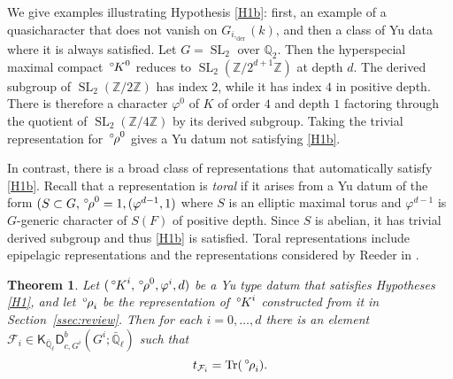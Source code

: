 \documentclass[10pt]{amsart}
\theoremstyle{plain}
\newtheorem{theorem}{Theorem}[section]
\theoremstyle{definition}
\newcommand{\ZZ}{{\mathbb{Z}}}
\newcommand{\QQ}{{\mathbb{Q}}}
\newcommand{\EE}{\mathbb{\bar Q}_\ell}
\DeclareMathOperator{\trace}{Tr}
\DeclareMathOperator{\SL}{SL}
\newcommand{\der}{_{\operatorname{der}}}
\newcommand{\trFrob}[1]{t_{#1}}
\newcommand{\cs}[1]{{\mathcal{#1}}}
\newcommand{\oK}{{\,^\circ \hskip-1pt K}}
\newcommand{\orho}{{\,^\circ \hskip-1pt \rho}}
\begin{document}
We give examples illustrating Hypothesis \ref{H1b}: first,
an example of a quasicharacter that does not vanish on $G_{i, \der}(k)$,
and then a class of Yu data where it is always satisfied.
Let $G = \SL_2$ over $\QQ_2$.
Then the hyperspecial maximal compact $\oK^0$ reduces to $\SL_2(\ZZ/2^{d+1}\ZZ)$ at depth $d$.
The derived subgroup of $\SL_2(\ZZ/2\ZZ)$ has index $2$, while it has index $4$ in positive depth.
There is therefore a character $\varphi^0$ of $K$ of order $4$ and depth $1$
factoring through the quotient of $\SL_2(\ZZ/4\ZZ)$ by its derived subgroup.
Taking the trivial representation for $\orho^0$ gives a Yu datum not satisfying \ref{H1b}. 

In contrast, there is a broad class of representations that automatically satisfy \ref{H1b}.
Recall that a representation is \emph{toral} 
if it arises from a Yu datum of the form $(S \subset G, \orho^0=1, (\varphi^{d-1}, 1)$ where
$S$ is an elliptic maximal torus and $\varphi^{d-1}$ is $G$-generic character of $S(F)$ of positive depth.
Since $S$ is abelian, it has trivial derived subgroup and thus \ref{H1b} is satisfied.
Toral representations include epipelagic representations \cite{reeder-yu:14a} and
the representations considered by Reeder in \cite{reeder:08a}.


\begin{theorem}\label{thm:geotypes}
Let $(\oK^i, \orho^0, \varphi^i,d)$ be a Yu type datum that satisfies Hypotheses~%
\ref{H1}, and let $\orho_i$ be the representation of $\oK^i$ constructed from it in Section~\ref{ssec:review}.  Then for each $i=0,\dots, d$ there is an element $\cs{F}_i \in \mathsf{K}_{\EE}\mathsf{D}^b_{c,G^i}(G^i;\EE)$ such that
\[
\trFrob{\cs{F}_i} = \trace(\orho_i).
\]
\end{theorem}
\end{document}
